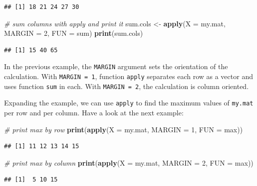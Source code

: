 \documentclass[11pt,]{book}
\newenvironment{Shaded}{\begin{snugshade}}{\end{snugshade}}
\newcommand{\KeywordTok}[1]{\textcolor[rgb]{0.27,0.27,0.27}{\textbf{#1}}}
\newcommand{\DataTypeTok}[1]{\textcolor[rgb]{0.27,0.27,0.27}{#1}}
\newcommand{\DecValTok}[1]{\textcolor[rgb]{0.06,0.06,0.06}{#1}}
\newcommand{\StringTok}[1]{\textcolor[rgb]{0.5,0.5,0.5}{#1}}
\newcommand{\CommentTok}[1]{\textcolor[rgb]{0.56,0.35,0.01}{\textit{#1}}}
\newcommand{\NormalTok}[1]{#1}
\begin{document}
\begin{verbatim}
## [1] 18 21 24 27 30
\end{verbatim}

\begin{Shaded}
\begin{Highlighting}[]
\CommentTok{# sum columns with apply and print it}
\NormalTok{sum.cols <-}\StringTok{ }\KeywordTok{apply}\NormalTok{(}\DataTypeTok{X =}\NormalTok{ my.mat, }\DataTypeTok{MARGIN =} \DecValTok{2}\NormalTok{, }\DataTypeTok{FUN =}\NormalTok{ sum)}
\KeywordTok{print}\NormalTok{(sum.cols)}
\end{Highlighting}
\end{Shaded}

\begin{verbatim}
## [1] 15 40 65
\end{verbatim}

In the previous example, the \texttt{MARGIN} argument sets the
orientation of the calculation. With \texttt{MARGIN\ =\ 1}, function
\texttt{apply} separates each row as a vector and uses function
\texttt{sum} in each. With \texttt{MARGIN\ =\ 2}, the calculation is
column oriented.

Expanding the example, we can use \texttt{apply} to find the maximum
values of \texttt{my.mat} per row and per column. Have a look at the
next example:

\begin{Shaded}
\begin{Highlighting}[]
\CommentTok{# print max by row}
\KeywordTok{print}\NormalTok{(}\KeywordTok{apply}\NormalTok{(}\DataTypeTok{X =}\NormalTok{ my.mat, }\DataTypeTok{MARGIN =} \DecValTok{1}\NormalTok{, }\DataTypeTok{FUN =}\NormalTok{ max))}
\end{Highlighting}
\end{Shaded}

\begin{verbatim}
## [1] 11 12 13 14 15
\end{verbatim}

\begin{Shaded}
\begin{Highlighting}[]
\CommentTok{# print max by column}
\KeywordTok{print}\NormalTok{(}\KeywordTok{apply}\NormalTok{(}\DataTypeTok{X =}\NormalTok{ my.mat, }\DataTypeTok{MARGIN =} \DecValTok{2}\NormalTok{, }\DataTypeTok{FUN =}\NormalTok{ max))}
\end{Highlighting}
\end{Shaded}

\begin{verbatim}
## [1]  5 10 15
\end{verbatim}
\end{document}
